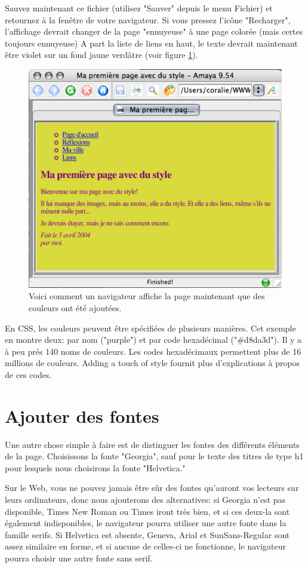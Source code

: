 Sauvez maintenant ce fichier (utilisez "Sauver" depuis le menu Fichier) et retournez à la fenêtre de votre navigateur. Si vous pressez l'icône "Recharger", l'affichage devrait changer de la page "ennuyeuse" à une page colorée (mais certes toujours ennuyeuse) A part la liste de liens en haut, le texte devrait maintenant être violet sur un fond jaune verdâtre (voir figure \ref{fig:screen3}). 
\begin{figure}[t]
	\begin{center}
		\includegraphics{voronin/img/capture2.png}	
		\caption{Voici comment un navigateur affiche la page maintenant que des couleurs ont été ajoutées. }
		\label{fig:screen3}
	\end{center}
\end{figure}
En CSS, les couleurs peuvent être spécifiées de plusieurs manières. Cet exemple en montre deux: par nom ("purple") et par code hexadécimal ("\#d8da3d"). Il y a à peu prés 140 noms de couleurs. Les codes hexadécimaux permettent plus de 16 millions de couleurs. Adding a touch of style fournit plus d'explications à propos de ces codes. 
\normalsize
\section{Ajouter des fontes}
Une autre chose simple à faire est de distinguer les fontes des différents éléments de la page. Choisissons la fonte "Georgia", sauf pour le texte des titres de type h1 pour lesquels nous choisirons la fonte "Helvetica."

Sur le Web, vous ne pouvez jamais être sûr des fontes qu'auront vos lecteurs sur leurs ordinateurs, donc nous ajouterons des alternatives: si Georgia n'est pas disponible, Times New Roman ou Times iront très bien, et si ces deux-la sont également indisponibles, le navigateur pourra utiliser une autre fonte dans la famille serifs. Si Helvetica est absente, Geneva, Arial et SunSans-Regular sont assez similaire en forme, et si aucune de celles-ci ne fonctionne, le navigateur pourra choisir une autre fonte sans serif.

